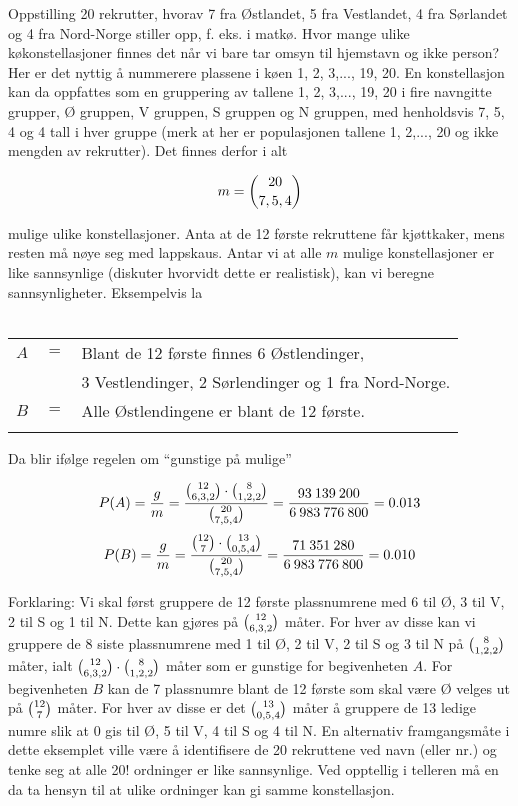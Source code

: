 \begin{eksempel}{Oppstilling}
20 rekrutter, hvorav 7 fra Østlandet, 5 fra Vestlandet, 4 fra
Sørlandet og 4 fra Nord-Norge stiller opp, f. eks. i matkø. Hvor
mange ulike køkonstellasjoner finnes det når vi bare tar omsyn
til hjemstavn og ikke person? Her er det nyttig å nummerere
plassene i køen 1, 2, 3,..., 19, 20. En konstellasjon kan da
oppfattes som en gruppering av tallene 1, 2, 3,..., 19, 20 i fire
navngitte grupper, Ø gruppen, V gruppen, S gruppen og N gruppen,
med henholdsvis 7, 5, 4 og 4 tall i hver gruppe (merk at her er
populasjonen tallene 1, 2,..., 20 og ikke mengden av rekrutter).
Det finnes derfor i alt
                      
\[ m={{20}\choose{7,5,4}} \]

\noindent mulige ulike konstellasjoner. Anta at de 12 første rekruttene får
kjøttkaker, mens resten må nøye seg med lappskaus. Antar vi at
alle $m$ mulige konstellasjoner er like sannsynlige (diskuter
hvorvidt dette er realistisk), kan vi beregne sannsynligheter.
Eksempelvis la \\ \\
\begin{tabular}{ccl}
     $A$&$=$& Blant de 12 første finnes 6 Østlendinger, \\
        &   & 3 Vestlendinger, 2 Sørlendinger og 1 fra Nord-Norge. \\
     $B$&$=$& Alle Østlendingene er blant de 12 første. \\ \\
\end{tabular}

\noindent Da blir ifølge regelen om ``gunstige på mulige''

\[ P(A)=\frac{g}{m}=\frac{{{12}\choose{6,3,2}} \cdot {{8}\choose{1,2,2}}}
    {{{20}\choose{7,5,4}}}=\frac{93\:139\:200}{6\:983\:776\:800}=0.013 \]
\[ P(B)=\frac{g}{m}=\frac{{{12}\choose{7}} \cdot {{13}\choose{0,5,4}}}
    {{{20}\choose{7,5,4}}}=\frac{71\:351\:280}{6\:983\:776\:800}=0.010 \]

\noindent Forklaring: Vi skal først gruppere de 12 første plassnumrene
 med 6 til Ø, 3 til V, 2 til S og 1 til N. Dette kan gjøres på
${{12}\choose{6,3,2}}$ måter. For hver av disse kan vi gruppere de 8 siste
 plassnumrene med 1 til Ø, 2 til V, 2 til S og 3 til N på
 ${{8}\choose{1,2,2}}$  måter, ialt ${{12}\choose{6,3,2}}\cdot {{8}\choose{1,2,2}}$
 måter som er gunstige for begivenheten $A$. For  
begivenheten $B$ kan de 7 plassnumre blant de 12 første som skal
være Ø velges ut på ${{12}\choose{7}}$ måter. For hver av disse
 er det ${{13}\choose{0,5,4}}$  måter å gruppere de 13 ledige numre
 slik at 0 gis til Ø, 5 til V, 4 til S og 4 til N.
En alternativ framgangsmåte i dette eksemplet ville være å
identifisere de 20 rekruttene ved navn (eller nr.) og tenke seg
at alle 20! ordninger er like sannsynlige. Ved opptellig i
telleren må en da ta hensyn til at ulike ordninger kan gi samme
konstellasjon.
\end{eksempel}
\normalsize

